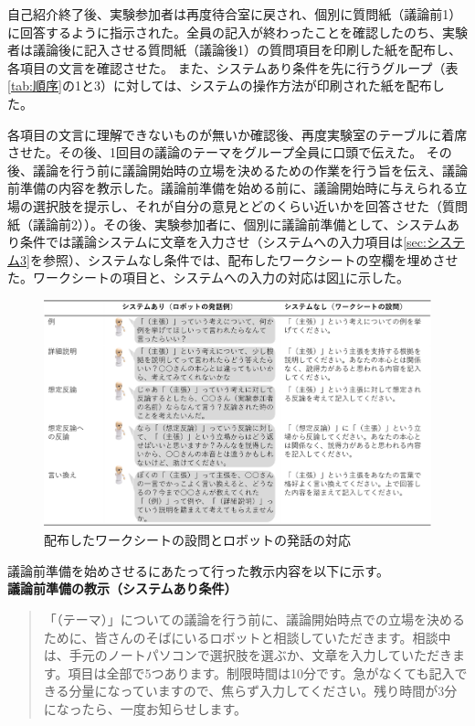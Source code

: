 \documentclass[11pt, a4paper]{jreport} %
\begin{document}
自己紹介終了後、実験参加者は再度待合室に戻され、個別に質問紙（議論前1）に回答するように指示された。全員の記入が終わったことを確認したのち、実験者は議論後に記入させる質問紙（議論後1）の質問項目を印刷した紙を配布し、各項目の文言を確認させた。
また、システムあり条件を先に行うグループ（表\ref{tab:順序}の1と3）に対しては、システムの操作方法が印刷された紙を配布した。

各項目の文言に理解できないものが無いか確認後、再度実験室のテーブルに着席させた。その後、1回目の議論のテーマをグループ全員に口頭で伝えた。
その後、議論を行う前に議論開始時の立場を決めるための作業を行う旨を伝え、議論前準備の内容を教示した。議論前準備を始める前に、議論開始時に与えられる立場の選択肢を提示し、それが自分の意見とどのくらい近いかを回答させた（質問紙（議論前2））。その後、実験参加者に、個別に議論前準備として、システムあり条件では議論システムに文章を入力させ（システムへの入力項目は\ref{sec:システム3}を参照）、システムなし条件では、配布したワークシートの空欄を埋めさせた。ワークシートの項目と、システムへの入力の対応は図\ref{fig:対応表}に示した。

\begin{figure}[htbp]
\begin{center}
\includegraphics[width=150mm]{images/ワークとシステムの対応.png}
\caption{配布したワークシートの設問とロボットの発話の対応}
\label{fig:対応表}
\end{center}
\end{figure}

議論前準備を始めさせるにあたって行った教示内容を以下に示す。\\

\textbf{議論前準備の教示（システムあり条件）}
\begin{quote}
「（テーマ）」についての議論を行う前に、議論開始時点での立場を決めるために、皆さんのそばにいるロボットと相談していただきます。相談中は、手元のノートパソコンで選択肢を選ぶか、文章を入力していただきます。項目は全部で5つあります。制限時間は10分です。急がなくても記入できる分量になっていますので、焦らず入力してください。残り時間が3分になったら、一度お知らせします。
\end{quote}
\end{document}
